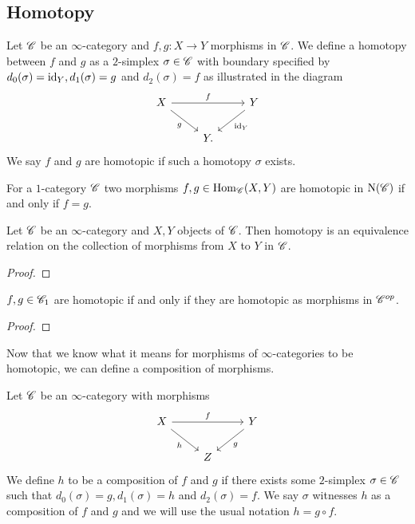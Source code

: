 \documentclass[../../thesis.tex]{subfiles}
\begin{document}
\subsection{Homotopy}
\begin{definition}
    Let $\mathscr{C}$ be an $\infty$-category and $f,g : X\to Y$ morphisms in $\mathscr{C}$.
    We define a homotopy between $f$ and $g$ as a $2$-simplex $\sigma \in \mathscr{C}$ with boundary specified by $d_0(\sigma) = \operatorname{id}_Y, d_1(\sigma) = g$ and $d_2(\sigma)=f$ as illustrated in the diagram
    \[\begin{tikzcd}
            X && Y \\
            & Y
            \arrow["f", from=1-1, to=1-3]
            \arrow["g"', from=1-1, to=2-2]
            \arrow["{\id_Y}", from=1-3, to=2-2].
        \end{tikzcd}\]
    We say $f$ and $g$ are homotopic if such a homotopy $\sigma$ exists.
\end{definition}
\begin{example}
    For a $1$-category $\mathscr{C}$ two morphisms $f,g \in \mathrm{Hom}_{\mathscr{C}}(X,Y)$ are homotopic in $\mathrm{N}(\mathscr{C})$ if and only if $f=g$.
\end{example}
\begin{proposition}
    Let $\mathscr{C}$ be an $\infty$-category and $X,Y$ objects of $\mathscr{C}$.
    Then homotopy is an equivalence relation on the collection of morphisms from $X$ to $Y$ in $\mathscr{C}$.
\end{proposition}
\begin{proof}
\end{proof}
\begin{proposition}
    $f,g \in \mathscr{C}_1$ are homotopic if and only if they are homotopic as morphisms in $\mathscr{C}^{op}$.
\end{proposition}
\begin{proof}
\end{proof}
Now that we know what it means for morphisms of $\infty$-categories to be homotopic, we can define a composition of morphisms.
\begin{definition}
    Let $\mathscr{C}$ be an $\infty$-category with morphisms
    \[\begin{tikzcd}
            X && Y \\
            & Z
            \arrow["f", from=1-1, to=1-3]
            \arrow["g", from=1-3, to=2-2]
            \arrow["h"', from=1-1, to=2-2]
        \end{tikzcd}\]
    We define $h$ to be a composition of $f$ and $g$ if there exists some $2$-simplex $\sigma \in \mathscr{C}$ such that $d_0(\sigma) = g, d_1(\sigma)=h$ and $d_2(\sigma)=f$.
    We say $\sigma$ witnesses $h$ as a composition of $f$ and $g$ and we will use the usual notation $h = g \circ f$.
\end{definition}
\end{document}
